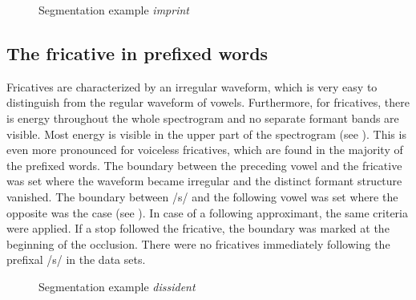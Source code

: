 \begin{figure} 
	\caption{Segmentation example \textit{imprint}}
	\label{fig:segmentation imprint} 
\end{figure}


\subsection{The fricative in prefixed words}
Fricatives are characterized by an irregular waveform, which is very easy to distinguish from the regular waveform of vowels. Furthermore, for fricatives, there is energy throughout the whole spectrogram and no separate formant bands are visible. Most energy is visible in the upper part of the spectrogram (see ). This is even more pronounced for voiceless fricatives, which are found in the majority of the prefixed words.
The boundary between the preceding vowel and the fricative was set where the waveform became irregular and the distinct formant structure vanished. The boundary between /s/ and the following vowel was set where the opposite was the case (see ). In case of a following approximant, the same criteria were applied. If a stop followed the fricative, the boundary was marked at the beginning of the occlusion. There were no fricatives immediately following the prefixal /s/ in the data sets.\\

\begin{figure} [H]
	
	\caption{Segmentation example \textit{dissident}}
	\label{fig:segmentation dissident}
\end{figure}



